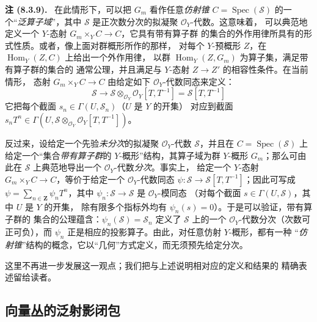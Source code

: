 \documentclass[UTF8,fontset=none,11pt,oneside,openany]{ctexbook}
\newenvironment{remark}[1][]{\par\medskip\noindent\textbf{注 (#1).}\ }{\par}
\newcommand{\oldpage}[2][]{%
  \hypertarget{ega-source-page-#1-#2}{}%
  \marginnote{\scriptsize\textbf{#1}~|~#2}\ignorespaces}
\let\EGAOriginalLabel\label
\renewcommand{\label}[1]{\phantomsection\EGAOriginalLabel{#1}}
\begin{document}
\begin{remark}[8.3.9]
在此情形下，可以把 $G_m$ 看作任意\emph{仿射锥}
$C=\operatorname{Spec}(\mathcal{S})$ 的一个“\emph{泛算子域}”，其中
$\mathcal{S}$ 是正次数分次的拟凝聚 $\mathcal{O}_Y$-代数。这意味着，
可以典范地定义一个 $Y$-态射 $G_m\times_YC\to C$，它具有带有算子群
的集合的外作用律所具有的形式性质。或者，像上面对群概形所作的那样，
对每个 $Y$-预概形 $Z$，在 $\operatorname{Hom}_Y(Z,C)$ 上给出一个外作用律，
以群 $\operatorname{Hom}_Y(Z,G_m)$ 为算子集，满足带有算子群的集合的
通常公理，并且满足与 $Y$-态射 $Z\to Z'$ 的相容性条件。在当前情形，
态射 $G_m\times_YC\to C$ 由给定如下 $\mathcal{O}_Y$-代数同态来定义：
\[
  \mathcal{S}\to
  \mathcal{S}\otimes_{\mathcal{O}_Y}\mathcal{O}_Y[T,T^{-1}]
  =\mathcal{S}[T,T^{-1}]
\]
它把每个截面 $s_n\in\Gamma(U,\mathcal{S}_n)$（$U$ 是 $Y$ 的开集）
对应到截面
$s_nT^n\in\Gamma(U,\mathcal{S}\otimes_{\mathcal{O}_Y}
\mathcal{O}_Y[T,T^{-1}])$。

反过来，设给定一个先验\emph{未分次}的拟凝聚
$\mathcal{O}_Y$-代数 $\mathcal{S}$，并且在
$C=\operatorname{Spec}(\mathcal{S})$ 上给定一个“集合\emph{带有算子群}的
$Y$-概形”结构，其算子域为群 $Y$-概形 $G_m$；那么可由此在
$\mathcal{S}$ 上典范地导出一个 $\mathcal{O}_Y$-代数\emph{分次}。事实上，
给定一个 $Y$-态射 $G_m\times_YC\to C$，等价于给定一个
$\mathcal{O}_Y$-代数同态
$\psi:\mathcal{S}\to\mathcal{S}[T,T^{-1}]$；因此可写成
$\psi=\sum_{n\in\mathbf{Z}}\psi_nT^n$，其中
$\psi_n:\mathcal{S}\to\mathcal{S}$ 是 $\mathcal{O}_Y$-模同态
（对每个截面 $s\in\Gamma(U,\mathcal{S})$，其中 $U$ 是 $Y$ 的开集，
除有限多个指标外均有 $\psi_n(s)=0$）。于是可以验证，带有算子群的
集合的公理蕴含：$\psi_n(\mathcal{S})=\mathcal{S}_n$ 定义了
$\mathcal{S}$ 上的一个 $\mathcal{O}_Y$-代数分次（次数可正可负），而
$\psi_n$ 正是相应的投影算子。由此，对任意仿射 $Y$-概形，都有一种
“\emph{仿射锥}”结构的概念，它以“几何”方式定义，而无须预先给定分次。

\oldpage[II]{168}
这里不再进一步发展这一观点；我们把与上述说明相对应的定义和结果的
精确表述留给读者。
\end{remark}

\subsection{向量丛的泛射影闭包}
\label{subsection:II.8.4-zh}
\end{document}
